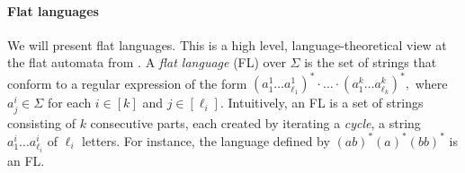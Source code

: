 





\paragraph{Flat languages}


We will present flat languages. This is a high level, language-theoretical view at the flat automata from \cite{Parosh:20:PLDI}. 
%
A \emph{flat language} (FL)  over $\Sigma$
is the set of strings 
that conform to a regular expression of the form
$
(a^1_1\ldots a^1_{\ell_1})^* \cdot \ldots \cdot (a^k_1\ldots a^k_{\ell_k})^*, 
$
where $a^i_j \in \Sigma$ for each $i \in [k]$ and $j \in [\ell_i]$.
Intuitively, an FL is a set of strings consisting of $k$ consecutive parts, each created by iterating a \emph{cycle}, a string $a^i_1\ldots a^i_{\ell_i}$ of $\ell_i$ letters. 
For instance, the language defined by $(ab)^*(a)^*(bb)^*$ is an FL.




